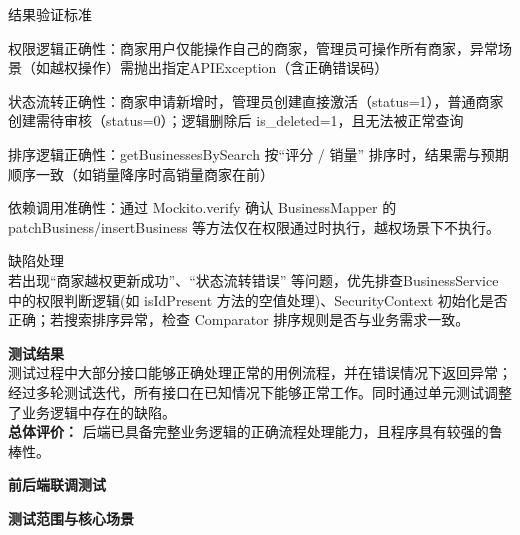 \begin{levellist}
\begin{levellist}
\begin{levellist}
            \item 结果验证标准
            \begin{levellist}
                \item 权限逻辑正确性：商家用户仅能操作自己的商家，管理员可操作所有商家，异常场景（如越权操作）需抛出指定APIException（含正确错误码）
                \item 状态流转正确性：商家申请新增时，管理员创建直接激活（status=1），普通商家创建需待审核（status=0）；逻辑删除后 is\_deleted=1，且无法被正常查询
                \item 排序逻辑正确性：getBusinessesBySearch 按“评分 / 销量” 排序时，结果需与预期顺序一致（如销量降序时高销量商家在前）
                \item 依赖调用准确性：通过 Mockito.verify 确认 BusinessMapper 的patchBusiness/insertBusiness 等方法仅在权限通过时执行，越权场景下不执行。
            \end{levellist}

            \item 缺陷处理 \\
            若出现“商家越权更新成功”、“状态流转错误” 等问题，优先排查BusinessService 中的权限判断逻辑(如 isIdPresent 方法的空值处理)、SecurityContext 初始化是否正确；若搜索排序异常，检查 Comparator 排序规则是否与业务需求一致。
        \end{levellist}

        \item \textbf{测试结果} \\
        测试过程中大部分接口能够正确处理正常的用例流程，并在错误情况下返回异常；经过多轮测试迭代，所有接口在已知情况下能够正常工作。同时通过单元测试调整了业务逻辑中存在的缺陷。\\
        \textbf{总体评价：} 后端已具备完整业务逻辑的正确流程处理能力，且程序具有较强的鲁棒性。

    \end{levellist}



    \item \textbf{前后端联调测试}
    \begin{levellist}
        \item \textbf{测试范围与核心场景}

        \begin{longtable}{>{\centering\arraybackslash}m{1cm} >{\centering\arraybackslash}m{5cm} >{\centering\arraybackslash}m{2cm} >{\centering\arraybackslash}m{2.5cm} >{\centering\arraybackslash}m{2cm}}


\end{longtable}
\end{levellist}
\end{levellist}
